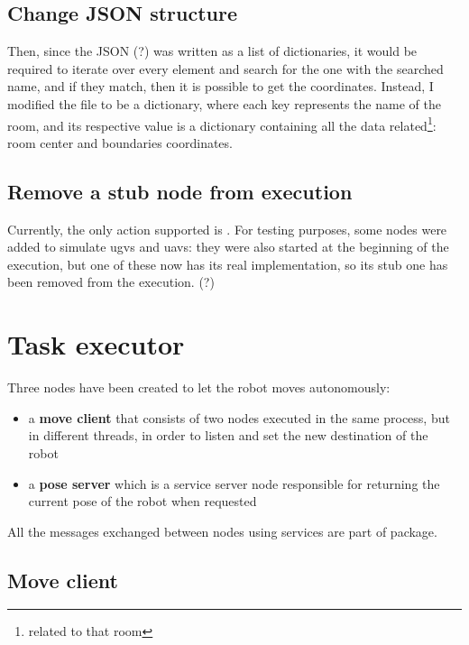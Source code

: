 \subsection{Change JSON structure}

Then, since the JSON (?) was written as a list of dictionaries, it would be required to iterate over every element and search for the one with the searched name, and if they match, then it is possible to get the coordinates. Instead, I modified the file to be a dictionary, where each key represents the name of the room, and its respective value is a dictionary containing all the data related\footnote{related to that room}: room center and boundaries coordinates.

\subsection{Remove a stub node from execution}

Currently, the only action supported is .
For testing purposes, some nodes were added to simulate \acrshort{ugv}s and \acrshort{uav}s: they were also started at the beginning of the execution, but one of these now has its real implementation, so its stub one has been removed from the execution. (?)

\section{Task executor}

Three nodes have been created to let the robot moves autonomously: 
\begin{itemize}
    \item a {\bf move client} that consists of two nodes executed in the same process, but in different threads, in order to listen and set the new destination of the robot
    \item a {\bf pose server} which is a service server node responsible for returning the current pose of the robot when requested
\end{itemize}

All the messages exchanged between nodes using services are part of  package. %

\subsection{Move client} %


